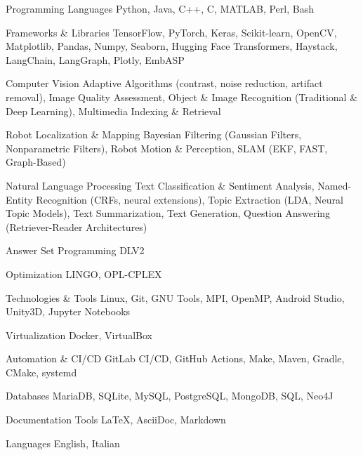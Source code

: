 

\begin{cvskills}
    
\cvskill
{Programming Languages}
{Python, Java, C++, C, MATLAB, Perl, Bash}

\cvskill
{Frameworks \& Libraries}
{TensorFlow, PyTorch, Keras, Scikit-learn, OpenCV, Matplotlib, Pandas, Numpy, Seaborn, Hugging Face Transformers, Haystack, LangChain, LangGraph, Plotly, EmbASP}

\cvskill
{Computer Vision}
{Adaptive Algorithms (contrast, noise reduction, artifact removal), Image Quality Assessment, Object \& Image Recognition (Traditional \& Deep Learning), Multimedia Indexing \& Retrieval}

\cvskill
{Robot Localization \& Mapping}
{Bayesian Filtering (Gaussian Filters, Nonparametric Filters), Robot Motion \& Perception, SLAM (EKF, FAST, Graph-Based)}

\cvskill
{Natural Language Processing}
{Text Classification \& Sentiment Analysis, Named-Entity Recognition (CRFs, neural extensions), Topic Extraction (LDA, Neural Topic Models), Text Summarization, Text Generation, Question Answering (Retriever-Reader Architectures)}

\cvskill
{Answer Set Programming}
{DLV2}

\cvskill
{Optimization}
{LINGO, OPL-CPLEX}

\cvskill
{Technologies \& Tools}
{Linux, Git, GNU Tools, MPI, OpenMP, Android Studio, Unity3D, Jupyter Notebooks}

\cvskill
{Virtualization}
{Docker, VirtualBox}

\cvskill
{Automation \& CI/CD}
{GitLab CI/CD, GitHub Actions, Make, Maven, Gradle, CMake, systemd}

\cvskill
{Databases}
{MariaDB, SQLite, MySQL, PostgreSQL, MongoDB, SQL, Neo4J}

\cvskill
{Documentation Tools}
{\LaTeX, AsciiDoc, Markdown}

\cvskill
{Languages}
{English, Italian}

\end{cvskills}
